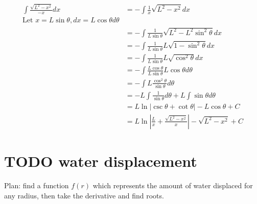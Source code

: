 \documentclass[letterpaper]{article}
\begin{document}
\[\begin{aligned}
   \int \frac{\sqrt{L^2-x^2}}{-x} dx &= - \int \frac{1}{x} \sqrt{L^2 - x^2} dx\\
   \text{Let } x = L \sin \theta, dx = L \cos  \theta d\theta \\
   &= - \int \frac{1}{L \sin \theta } \sqrt{L^2 - L ^2 \sin  ^2 \theta } dx\\
   &= - \int \frac{1}{L \sin \theta } L \sqrt{1 - \sin  ^2 \theta } dx\\
   &= - \int \frac{1}{L \sin \theta } L \sqrt{\cos  ^2 \theta } dx\\
   &= - \int \frac{L \cos  \theta }{L \sin  \theta } L \cos  \theta  d\theta \\
   &= - \int L \frac{\cos ^2 \theta}{\sin  \theta} d\theta\\
   &= - L \int \frac{1}{\sin \theta } d\theta  + L \int \sin  \theta  d\theta\\
   &= L \ln  \lvert \csc \theta  + \cot  \theta  \rvert - L \cos  \theta +C\\
   &= L \ln  \left\lvert \frac{L}{x}  + \frac{\sqrt{L^2-x^2}}{x} \right\rvert - \sqrt{L^2-x^2} +C
   \end{aligned}\]

\section{{\bfseries\sffamily TODO} water displacement}
\label{sec:orgeeb3837}

Plan: find a function \(f(r)\) which represents the amount of water displaced for any radius, then take the derivative and find roots.
\end{document}
